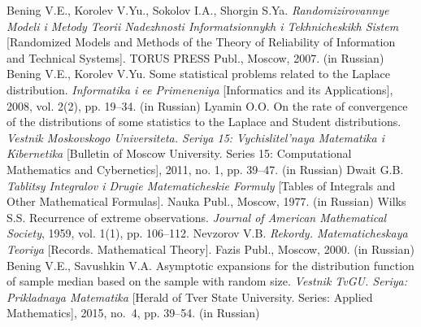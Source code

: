 \documentclass[a4paper,twoside]{article}
\theoremstyle{theorem}
\theoremstyle{remark}
\begin{document}
\begin{thebibliography}{99}
\bibitem{} Bening V.E., Korolev V.Yu., Sokolov I.A., Shorgin S.Ya. {\it Randomizirovannye Modeli i Metody Teorii Nadezhnosti Informatsionnykh i Tekhnicheskikh Sistem} [Randomized Models and Methods of the Theory of Reliability of Information and Technical Systems]. TORUS PRESS Publ., Moscow, 2007. (in Russian)
 Bening V.E., Korolev V.Yu. Some statistical problems related to the Laplace distribution. {\it Informatika i ee Primeneniya} [Informatics and its Applications], 2008, vol. 2(2), pp. 19--34. (in Russian)
 Lyamin O.O. On the rate of convergence of the distributions of some statistics to the Laplace and Student distributions. {\it Vestnik Moskovskogo Universiteta. Seriya 15: Vychislitel'naya Matematika i Kibernetika} [Bulletin of Moscow University. Series 15: Computational Mathematics and Cybernetics], 2011, no. 1, pp. 39--47. (in Russian)
 Dwait G.B. {\it Tablitsy Integralov i Drugie Matematicheskie Formuly} [Tables of Integrals and Other Mathematical Formulas]. Nauka Publ., Moscow, 1977. (in Russian)
 Wilks S.S. Recurrence of extreme observations. {\it Journal of American Mathematical Society}, 1959, vol. 1(1), pp. 106--112.
 Nevzorov V.B. {\it Rekordy. Matematicheskaya Teoriya} [Records. Mathematical Theory]. Fazis Publ., Moscow, 2000. (in Russian)
\bibitem{} Bening V.E., Savushkin V.A. Asymptotic expansions for the distribution function of sample median based on the sample with random size. {\it Vestnik TvGU. Seriya: Prikladnaya Matematika} [Herald of Tver State University. Series: Applied Mathematics], 2015, no.~4, pp. 39--54. (in Russian)
\end{thebibliography} 
\end{document}
